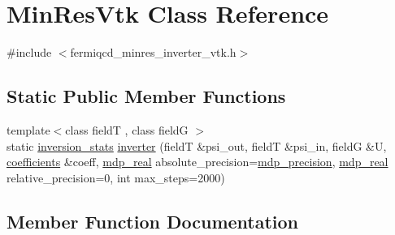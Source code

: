 \hypertarget{class_min_res_vtk}{}\section{Min\+Res\+Vtk Class Reference}
\label{class_min_res_vtk}


{\ttfamily \#include $<$fermiqcd\+\_\+minres\+\_\+inverter\+\_\+vtk.\+h$>$}

\subsection*{Static Public Member Functions}
\begin{DoxyCompactItemize}
\item 
{\footnotesize template$<$class fieldT , class fieldG $>$ }\\static \hyperlink{classinversion__stats}{inversion\+\_\+stats} \hyperlink{class_min_res_vtk_aaeaf867eac59d7f9409e29f5291cf0fe}{inverter} (fieldT \&psi\+\_\+out, fieldT \&psi\+\_\+in, fieldG \&U, \hyperlink{classcoefficients}{coefficients} \&coeff, \hyperlink{mdp__global__vars_8h_a69d96b74c791e0bbdb888b3913a69450}{mdp\+\_\+real} absolute\+\_\+precision=\hyperlink{mdp__global__vars_8h_a443a4ca745298420893e113a7ac926a9}{mdp\+\_\+precision}, \hyperlink{mdp__global__vars_8h_a69d96b74c791e0bbdb888b3913a69450}{mdp\+\_\+real} relative\+\_\+precision=0, int max\+\_\+steps=2000)
\end{DoxyCompactItemize}


\subsection{Member Function Documentation}
\mbox{\label{class_min_res_vtk_aaeaf867eac59d7f9409e29f5291cf0fe}} 
